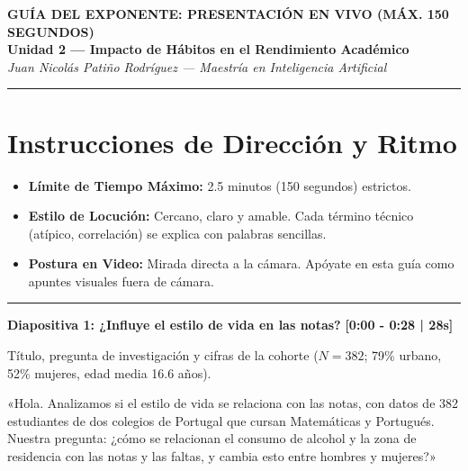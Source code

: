 \documentclass[11pt,a4paper]{article}
\begin{document}
\begin{center}
  {\fontsize{16}{20}\selectfont \color{sabanaBlue}\bfseries GUÍA DEL EXPONENTE: PRESENTACIÓN EN VIVO (MÁX. 150 SEGUNDOS)}\\[0.2cm]
  {\fontsize{12}{15}\selectfont \color{darkGrey}\bfseries Unidad 2 — Impacto de Hábitos en el Rendimiento Académico}\\[0.1cm]
  {\color{accentGrey}\itshape Juan Nicolás Patiño Rodríguez — Maestría en Inteligencia Artificial}\\[0.5cm]
  \hrule
\end{center}

\vspace{0.3cm}

\section*{Instrucciones de Dirección y Ritmo}
\begin{itemize}[noitemsep,topsep=0pt]
  \item \textbf{Límite de Tiempo Máximo:} 2.5 minutos (150 segundos) estrictos.
  \item \textbf{Estilo de Locución:} Cercano, claro y amable. Cada término técnico (atípico, correlación) se explica con palabras sencillas.
  \item \textbf{Postura en Video:} Mirada directa a la cámara. Apóyate en esta guía como apuntes visuales fuera de cámara.
\end{itemize}

\hrule

\vspace{0.5cm}

\noindent
\textbf{\large Diapositiva 1: ¿Influye el estilo de vida en las notas?} \hfill \textcolor{timeRed}{\textbf{[0:00 - 0:28 | 28s]}}
\begin{description}[noitemsep,topsep=2pt]
  \item[Visual en Pantalla:] Título, pregunta de investigación y cifras de la cohorte ($N = 382$; 79\% urbano, 52\% mujeres, edad media 16.6 años).
  \item[Guion de Voz (Speech):]
    «Hola. Analizamos si el estilo de vida se relaciona con las notas, con datos de 382 estudiantes de dos colegios de Portugal que cursan Matemáticas y Portugués. Nuestra pregunta: ¿cómo se relacionan el consumo de alcohol y la zona de residencia con las notas y las faltas, y cambia esto entre hombres y mujeres?»
\end{description}
\end{document}
